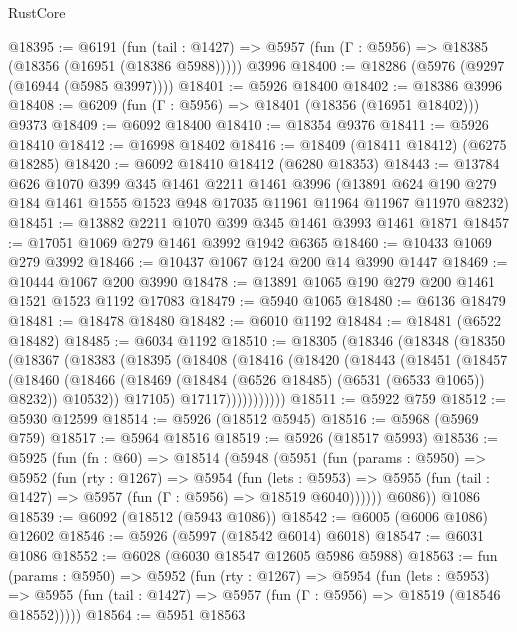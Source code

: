 \begin{lexlean}{RustCore}
\begin{coremodule}
@18395 := @6191
    (fun (tail : @1427) => @5957 (fun (Γ : @5956) => @18385 (@18356 (@16951 (@18386 @5988)))))
    @3996
@18400 := @18286 (@5976 (@9297 (@16944 (@5985 @3997))))
@18401 := @5926 @18400
@18402 := @18386 @3996
@18408 := @6209 (fun (Γ : @5956) => @18401 (@18356 (@16951 @18402))) @9373
@18409 := @6092 @18400
@18410 := @18354 @9376
@18411 := @5926 @18410
@18412 := @16998 @18402
@18416 := @18409 (@18411 @18412) (@6275 @18285)
@18420 := @6092 @18410 @18412 (@6280 @18353)
@18443 := @13784
    @626
    @1070
    @399
    @345
    @1461
    @2211
    @1461
    @3996
    (@13891 @624 @190 @279 @184 @1461 @1555 @1523 @948 @17035 @11961 @11964 @11967 @11970 @8232)
@18451 := @13882 @2211 @1070 @399 @345 @1461 @3993 @1461 @1871
@18457 := @17051 @1069 @279 @1461 @3992 @1942 @6365
@18460 := @10433 @1069 @279 @3992
@18466 := @10437 @1067 @124 @200 @14 @3990 @1447
@18469 := @10444 @1067 @200 @3990
@18478 := @13891 @1065 @190 @279 @200 @1461 @1521 @1523 @1192 @17083
@18479 := @5940 @1065
@18480 := @6136 @18479
@18481 := @18478 @18480
@18482 := @6010 @1192
@18484 := @18481 (@6522 @18482)
@18485 := @6034 @1192
@18510 := @18305
    (@18346
      (@18348
        (@18350
          (@18367
            (@18383
              (@18395
                (@18408
                  (@18416
                    (@18420
                      (@18443
                        (@18451
                          (@18457
                            (@18460
                              (@18466
                                (@18469 (@18484 (@6526 @18485) (@6531 (@6533 @1065)) @8232))
                                @10532))
                            @17105)
                          @17117)))))))))))
@18511 := @5922 @759
@18512 := @5930 @12599
@18514 := @5926 (@18512 @5945)
@18516 := @5968 (@5969 @759)
@18517 := @5964 @18516
@18519 := @5926 (@18517 @5993)
@18536 := @5925
    (fun (fn : @60) =>
    @18514
      (@5948
        (@5951
          (fun (params : @5950) =>
          @5952
            (fun (rty : @1267) =>
            @5954
              (fun (lets : @5953) =>
              @5955 (fun (tail : @1427) => @5957 (fun (Γ : @5956) => @18519 @6040))))))
        @6086))
    @1086
@18539 := @6092 (@18512 (@5943 @1086))
@18542 := @6005 (@6006 @1086) @12602
@18546 := @5926 (@5997 (@18542 @6014) @6018)
@18547 := @6031 @1086
@18552 := @6028 (@6030 @18547 @12605 @5986 @5988)
@18563 := fun (params : @5950) =>
  @5952
    (fun (rty : @1267) =>
    @5954
      (fun (lets : @5953) =>
      @5955 (fun (tail : @1427) => @5957 (fun (Γ : @5956) => @18519 (@18546 @18552)))))
@18564 := @5951 @18563

\end{coremodule}
\end{lexlean}
